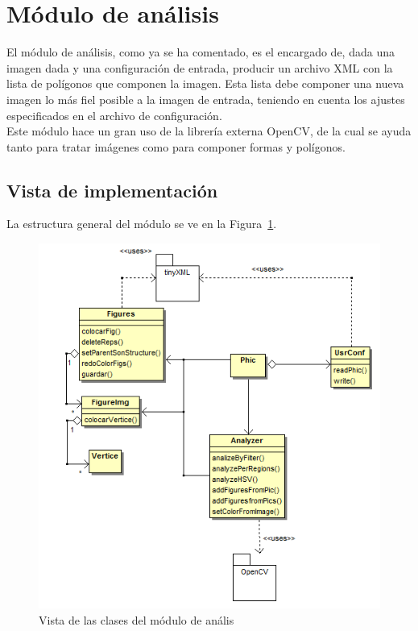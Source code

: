 \section{Módulo de análisis}


El módulo de análisis, como ya se ha comentado, es el encargado de, dada una imagen dada y una configuración de entrada, producir un archivo XML con la lista de polígonos que componen la imagen. Esta lista debe componer una nueva imagen lo más fiel posible a la imagen de entrada, teniendo en cuenta los ajustes especificados en el archivo de configuración.\\

Este módulo hace un gran uso de la librería externa OpenCV, de la cual se ayuda tanto para tratar imágenes como para componer formas y polígonos.

\subsection{Vista de implementación}

La estructura general del módulo se ve en la Figura~\ref{fig:diagramaclasesPHIC}.\\

		\begin{figure}[htbp]
		\centering
		\includegraphics[scale=0.6]{graphics/diagramaclasesPHIC.png}
		\caption{Vista de las clases del módulo de anális}
		\label{fig:diagramaclasesPHIC}
		\end{figure}
		

